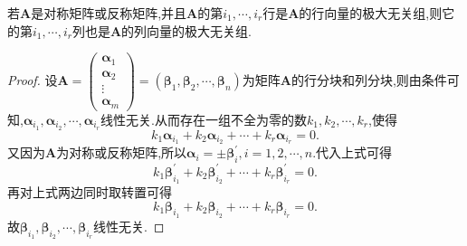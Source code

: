 \documentclass[../../main.tex]{subfiles}%
\begin{document}
\begin{proposition}\label{proposition:对称矩阵或反称矩阵的极大无关组}
若\(\boldsymbol{A}\)是对称矩阵或反称矩阵,并且\(\boldsymbol{A}\)的第\(i_1,\cdots,i_r\)行是\(\boldsymbol{A}\)的行向量的极大无关组,则它的第\(i_1,\cdots,i_r\)列也是\(\boldsymbol{A}\)的列向量的极大无关组.
\end{proposition}
\begin{proof}

设\(\boldsymbol{A}=\begin{pmatrix}
\boldsymbol{\alpha}_1 \\
\boldsymbol{\alpha}_2 \\
\vdots \\
\boldsymbol{\alpha}_m
\end{pmatrix}=(\boldsymbol{\beta}_1,\boldsymbol{\beta}_2,\cdots,\boldsymbol{\beta}_n)\)为矩阵\(\boldsymbol{A}\)的行分块和列分块,则由条件可知,\(\boldsymbol{\alpha}_{i_1},\boldsymbol{\alpha}_{i_2},\cdots,\boldsymbol{\alpha}_{i_r}\)线性无关.从而存在一组不全为零的数\(k_1,k_2,\cdots,k_r\),使得
\[k_1\boldsymbol{\alpha}_{i_1}+k_2\boldsymbol{\alpha}_{i_2}+\cdots +k_r\boldsymbol{\alpha}_{i_r}=0.\]
又因为\(\boldsymbol{A}\)为对称或反称矩阵,所以\(\boldsymbol{\alpha}_i = \pm\boldsymbol{\beta}_{i}^{\prime}, i = 1,2,\cdots,n\).代入上式可得
\[k_1\boldsymbol{\beta}_{i_1}^{\prime}+k_2\boldsymbol{\beta}_{i_2}^{\prime}+\cdots +k_r\boldsymbol{\beta}_{i_r}^{\prime}=0.\]
再对上式两边同时取转置可得
\[k_1\boldsymbol{\beta}_{i_1}+k_2\boldsymbol{\beta}_{i_2}+\cdots +k_r\boldsymbol{\beta}_{i_r}=0.\]
故\(\boldsymbol{\beta}_{i_1},\boldsymbol{\beta}_{i_2},\cdots,\boldsymbol{\beta}_{i_r}\)线性无关.

\end{proof}
\end{document}
